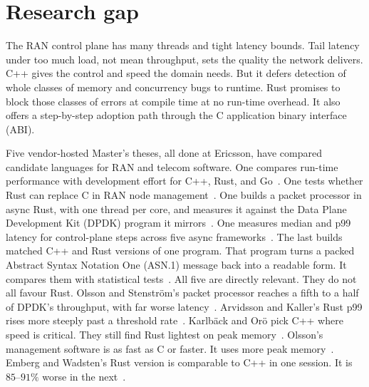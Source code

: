\documentclass[english,oneside,a4paper,censored,csm,software-track-2020]{HYthesisML}
\begin{document}
\section{Research gap}\label{sec:gap}
The RAN control plane has many threads and
tight latency bounds. Tail latency under too much load, not mean throughput, sets
the quality the network delivers. C++ gives the control and speed the domain
needs. But it defers detection of whole classes of memory and concurrency bugs
to runtime. Rust promises to block those classes of errors at compile time at no
run-time overhead. It also offers a step-by-step adoption path through the C
application binary interface (ABI).

Five vendor-hosted Master's theses, all
done at Ericsson, have compared candidate languages for RAN and telecom
software. One compares run-time performance with development effort for C++,
Rust, and Go~\cite{karlback2021ran}. One tests whether Rust can replace C in
RAN node management~\cite{olsson2023ranmgmt}. One builds a packet processor in
async Rust, with one thread per core, and measures it against the Data Plane
Development Kit (DPDK) program it mirrors~\cite{olsson2023asyncpackets}. One
measures median and p99 latency for control-plane steps across five async
frameworks~\cite{arvidsson2025async}. The last builds matched C++ and Rust
versions of one program. That program turns a packed Abstract Syntax Notation
One (ASN.1) message back into a readable form. It compares
them with statistical tests~\cite{emberg2023asn1}. All five are directly
relevant. They do not all favour Rust. Olsson and Stenstr\"om's packet
processor reaches a fifth to a half of DPDK's throughput, with far worse
latency~\cite{olsson2023asyncpackets}. Arvidsson and Kaller's Rust p99 rises
more steeply past a threshold rate~\cite{arvidsson2025async}. Karlb\"ack and
Or\"o pick C++ where speed is critical. They still find Rust lightest on peak
memory~\cite{karlback2021ran}. Olsson's management software is as fast as C or
faster. It uses more peak memory~\cite{olsson2023ranmgmt}. Emberg and
Wadsten's Rust version is comparable to C++ in one session. It is $85$--$91\%$ worse in the
next~\cite{emberg2023asn1}.
\end{document}
